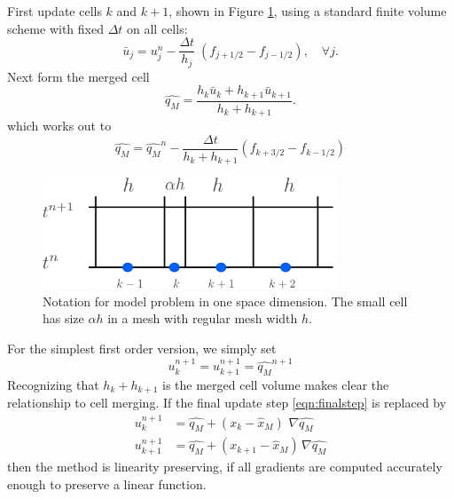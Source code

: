 First  update cells $k$ and $k+1$, shown in Figure \ref{fig:modelProblem1},  using a standard finite volume scheme
with fixed $\Delta t$ on all cells:
\begin{equation}
\bar{u}_j = u_j^n - \frac{\Delta t}{h_j} \; (f_{j+1/2} - f_{j-1/2} ), 
\quad \forall j.
\label{eqn:fvupdate}
\end{equation}
Next form the merged cell
\begin{equation}
\widehat{q_M} =  \frac{ h_k \bar{u}_k + h_{k+1} \bar{u}_{k+1} } {h_k +
h_{k+1}} .
\label{eqn:mergestep}
\end{equation}
which works out to
\begin{equation}
\widehat{q_M} = \widehat{q_M}^n - 
\frac{\Delta t}{h_k + h_{k+1}} (f_{k+3/2} - f_{k-1/2})
\end{equation}

\begin{figure}
\begin{center}
\includegraphics[height=1.3in]{figs/1dfig.pdf}
\caption{\sf Notation for model problem in one space dimension. The small
cell has size $\alpha h$ in a mesh with regular mesh width $h$.}
\label{fig:modelProblem1}
\end{center}
\end{figure}


For the simplest first order version, we simply set
\begin{equation}
u_k^{n+1} = u_{k+1}^{n+1} = \widehat{q_M}^{n+1} 
\label{eqn:finalstep}
\end{equation}
Recognizing that $h_k+h_{k+1}$ is the merged cell volume makes 
clear the relationship to cell merging.
If the final update step \eqref{eqn:finalstep}  is replaced by 
\begin{equation}
\begin{split}
u_k^{n+1} &= \widehat{q_M} +  (x_k - \widehat{x}_M) \,\, \nabla \widehat{q_M}\\
u_{k+1}^{n+1} &= \widehat{q_M} +  (x_{k+1} - \widehat{x}_M) \, \nabla \widehat{q_M}
\end{split}
\end{equation}
then the method is linearity preserving, 
if all gradients are computed accurately enough to preserve a linear function.  

